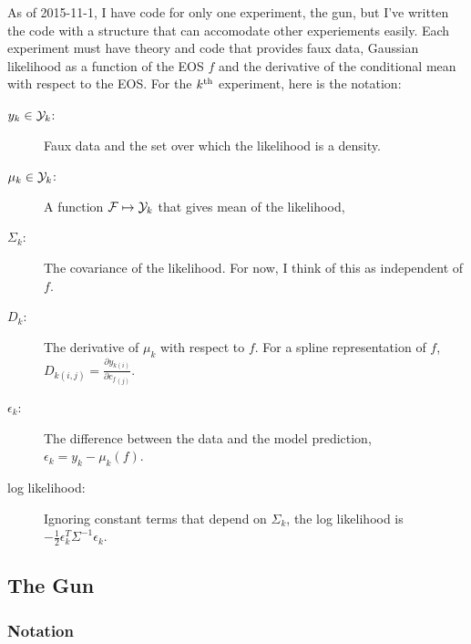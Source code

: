 \documentclass[11pt]{article}
\newcommand{\eos}{f}
\newcommand{\EOS}{{\cal F}}
\newcommand{\data}{y}
\newcommand{\DATA}{{\cal Y}}
\newcommand\cf{c_f}
\begin{document}
As of 2015-11-1, I have code for only one experiment, the gun, but
I've written the code with a structure that can accomodate other
experiements easily.  Each experiment must have theory and code that
provides faux data, Gaussian likelihood as a function of the EOS
$\eos$ and the derivative of the conditional mean with respect to the
EOS.  For the $k^{\rm th}$ experiment, here is the notation:
\begin{description}
\item[$\data_k\in \DATA_k$:] Faux data and the set over which the
  likelihood is a density.
\item[$\mu_k \in \DATA_k$:] A function $\EOS\mapsto \DATA_k$ that gives mean of
  the likelihood,
\item[$\Sigma_k$:] The covariance of the likelihood.  For now, I think
  of this as independent of $\eos$.
\item[$D_k$:] The derivative of $\mu_k$ with respect to $\eos$.  For a
  spline representation of $\eos$, $D_{k(i,j)} =\frac{\partial
    \data_{k(i)}}{\partial {\cf} _{(j)}}$.
\item[$\epsilon_k$:] The difference between the data and the model
  prediction, $\epsilon_k = \data_k - \mu_k(\eos)$.
\item[log likelihood:] Ignoring constant terms that depend on
  $\Sigma_k$, the log likelihood is $-\frac{1}{2}\epsilon_k^T
  \Sigma^{-1} \epsilon_k$.
\end{description}

\subsection{The Gun}
\label{sec:gun}


\subsubsection{Notation}
\label{sec:basic_notation}
\end{document}

